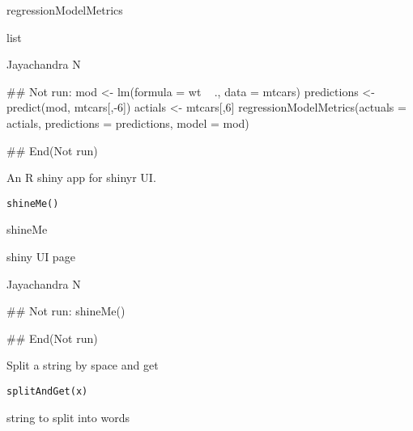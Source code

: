 \documentclass[a4paper]{book}
\begin{document}
%
\begin{Details}\relax
regressionModelMetrics
\end{Details}
%
\begin{Value}
list
\end{Value}
%
\begin{Author}\relax
Jayachandra N
\end{Author}
%
\begin{Examples}
\begin{ExampleCode}
## Not run: 
mod <- lm(formula = wt ~ ., data = mtcars)
predictions <- predict(mod, mtcars[,-6])
actials <- mtcars[,6]
regressionModelMetrics(actuals = actials,
predictions = predictions, model = mod)

## End(Not run)
\end{ExampleCode}
\end{Examples}
%
\begin{Description}\relax
An R shiny app for shinyr UI.
\end{Description}
%
\begin{Usage}
\begin{verbatim}
shineMe()
\end{verbatim}
\end{Usage}
%
\begin{Details}\relax
shineMe
\end{Details}
%
\begin{Value}
shiny UI page
\end{Value}
%
\begin{Author}\relax
Jayachandra N
\end{Author}
%
\begin{Examples}
\begin{ExampleCode}
## Not run: 
shineMe()

## End(Not run)
\end{ExampleCode}
\end{Examples}
%
\begin{Description}\relax
Split a string by space and get
\end{Description}
%
\begin{Usage}
\begin{verbatim}
splitAndGet(x)
\end{verbatim}
\end{Usage}
%
\begin{Arguments}
\begin{ldescription}
\item[\code{x}] string to split into words
\end{ldescription}
\end{Arguments}
\end{document}

